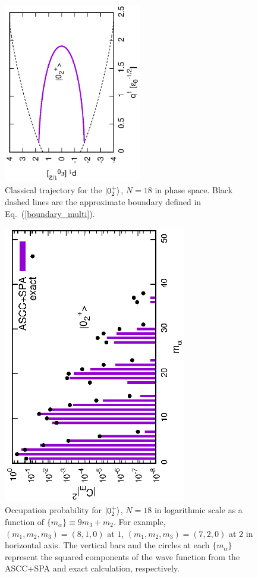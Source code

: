 \documentclass[11pt]{book} %
\begin{document}
\begin{figure}[bt]
 \begin{center}
  \includegraphics[width=60mm,angle=-90]{images/N18trajectory.eps}
 \end{center}
	\caption{Classical trajectory for the $\ket{0_2^+}$, $N=18$ in phase space. Black dashed lines are the approximate boundary defined in Eq.~(\ref{boundary_multi}).
}
 \label{open-trajectory}
\end{figure}

\begin{figure}[bt]
 \begin{center}
  \includegraphics[width=80mm,angle=-90]{images/N18g0p05occ.eps}
 \end{center}
	\caption{Occupation probability for $\ket{0_2^+}$, $N=18$ in logarithmic scale as a function of $\{m_{\alpha}\}\equiv9m_3+m_2$. For example, $(m_1,m_2,m_3)=(8,1,0)$ at $1$, $(m_1,m_2,m_3)=(7,2,0)$ at $2$ in horizontal axis. The vertical bars and the circles at each $\{m_{\alpha}\}$ represent the squared components of the wave function from the ASCC+SPA and exact calculation, respectively.
}
 \label{N18occ}
\end{figure}
\end{document}
